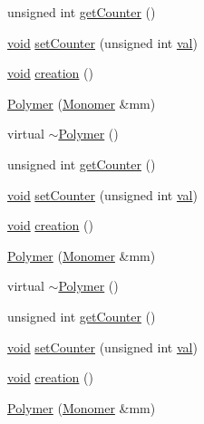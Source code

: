 \begin{DoxyCompactItemize}
unsigned int \mbox{\hyperlink{class_polymer_a8346d821e5f8690d7816ba1d40036b69}{get\+Counter}} ()
\item 
\mbox{\hyperlink{glad_8h_a950fc91edb4504f62f1c577bf4727c29}{void}} \mbox{\hyperlink{class_polymer_a7ed6bbe09a570b59f9253d63fd3326d2}{set\+Counter}} (unsigned int \mbox{\hyperlink{glad_8h_a26942fd2ed566ef553eae82d2c109c8f}{val}})
\item 
\mbox{\hyperlink{glad_8h_a950fc91edb4504f62f1c577bf4727c29}{void}} \mbox{\hyperlink{class_polymer_a1daba3eb2ba8428bf2f3e814668b155f}{creation}} ()
\item 
\mbox{\hyperlink{class_polymer_ae77454a3908652e4df6a26b9cac509a5}{Polymer}} (\mbox{\hyperlink{class_monomer}{Monomer}} \&mm)
\item 
virtual \mbox{\hyperlink{class_polymer_aac2b3983f375a5691c7d5ca1a79594d5}{$\sim$\+Polymer}} ()
\item 
unsigned int \mbox{\hyperlink{class_polymer_a8346d821e5f8690d7816ba1d40036b69}{get\+Counter}} ()
\item 
\mbox{\hyperlink{glad_8h_a950fc91edb4504f62f1c577bf4727c29}{void}} \mbox{\hyperlink{class_polymer_a7ed6bbe09a570b59f9253d63fd3326d2}{set\+Counter}} (unsigned int \mbox{\hyperlink{glad_8h_a26942fd2ed566ef553eae82d2c109c8f}{val}})
\item 
\mbox{\hyperlink{glad_8h_a950fc91edb4504f62f1c577bf4727c29}{void}} \mbox{\hyperlink{class_polymer_a1daba3eb2ba8428bf2f3e814668b155f}{creation}} ()
\item 
\mbox{\hyperlink{class_polymer_ae77454a3908652e4df6a26b9cac509a5}{Polymer}} (\mbox{\hyperlink{class_monomer}{Monomer}} \&mm)
\item 
virtual \mbox{\hyperlink{class_polymer_aac2b3983f375a5691c7d5ca1a79594d5}{$\sim$\+Polymer}} ()
\item 
unsigned int \mbox{\hyperlink{class_polymer_a8346d821e5f8690d7816ba1d40036b69}{get\+Counter}} ()
\item 
\mbox{\hyperlink{glad_8h_a950fc91edb4504f62f1c577bf4727c29}{void}} \mbox{\hyperlink{class_polymer_a7ed6bbe09a570b59f9253d63fd3326d2}{set\+Counter}} (unsigned int \mbox{\hyperlink{glad_8h_a26942fd2ed566ef553eae82d2c109c8f}{val}})
\item 
\mbox{\hyperlink{glad_8h_a950fc91edb4504f62f1c577bf4727c29}{void}} \mbox{\hyperlink{class_polymer_a1daba3eb2ba8428bf2f3e814668b155f}{creation}} ()
\item 
\mbox{\hyperlink{class_polymer_ae77454a3908652e4df6a26b9cac509a5}{Polymer}} (\mbox{\hyperlink{class_monomer}{Monomer}} \&mm)
\item 

\end{DoxyCompactItemize}
